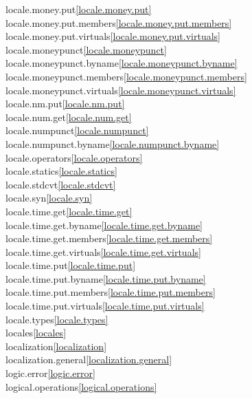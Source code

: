 \begin{multicols}{2}
locale.money.put\quad\ref{locale.money.put}\\
locale.money.put.members\quad\ref{locale.money.put.members}\\
locale.money.put.virtuals\quad\ref{locale.money.put.virtuals}\\
locale.moneypunct\quad\ref{locale.moneypunct}\\
locale.moneypunct.byname\quad\ref{locale.moneypunct.byname}\\
locale.moneypunct.members\quad\ref{locale.moneypunct.members}\\
locale.moneypunct.virtuals\quad\ref{locale.moneypunct.virtuals}\\
locale.nm.put\quad\ref{locale.nm.put}\\
locale.num.get\quad\ref{locale.num.get}\\
locale.numpunct\quad\ref{locale.numpunct}\\
locale.numpunct.byname\quad\ref{locale.numpunct.byname}\\
locale.operators\quad\ref{locale.operators}\\
locale.statics\quad\ref{locale.statics}\\
locale.stdcvt\quad\ref{locale.stdcvt}\\
locale.syn\quad\ref{locale.syn}\\
locale.time.get\quad\ref{locale.time.get}\\
locale.time.get.byname\quad\ref{locale.time.get.byname}\\
locale.time.get.members\quad\ref{locale.time.get.members}\\
locale.time.get.virtuals\quad\ref{locale.time.get.virtuals}\\
locale.time.put\quad\ref{locale.time.put}\\
locale.time.put.byname\quad\ref{locale.time.put.byname}\\
locale.time.put.members\quad\ref{locale.time.put.members}\\
locale.time.put.virtuals\quad\ref{locale.time.put.virtuals}\\
locale.types\quad\ref{locale.types}\\
locales\quad\ref{locales}\\
localization\quad\ref{localization}\\
localization.general\quad\ref{localization.general}\\
logic.error\quad\ref{logic.error}\\
logical.operations\quad\ref{logical.operations}\\

\end{multicols}
